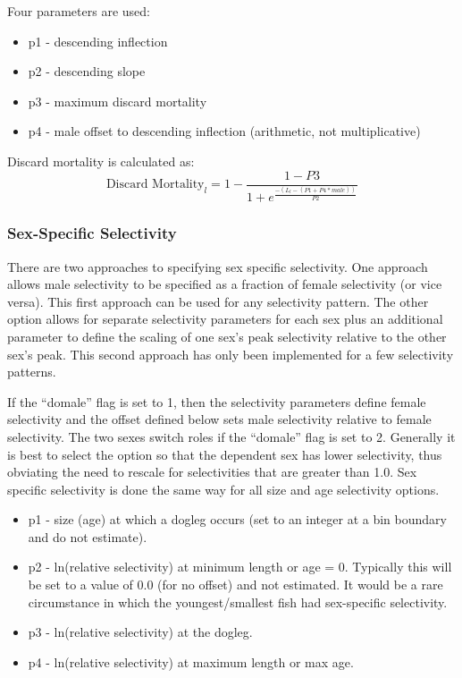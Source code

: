 Four parameters are used:
\begin{itemize}
	\item p1 - descending inflection
	\item p2 - descending slope
	\item p3 - maximum discard mortality
	\item p4 - male offset to descending inflection (arithmetic, not multiplicative)
\end{itemize}

Discard mortality is calculated as:
\begin{equation}
	\text{Discard Mortality}_l = 1 - \frac{1-P3}{1+e^{\frac{-(L_l-(P1+P4*male))}{P2}}}
\end{equation}

\subsubsection{Sex-Specific Selectivity}
There are two approaches to specifying sex specific selectivity. One approach allows male selectivity to be specified as a fraction of female selectivity (or vice versa). This first approach can be used for any selectivity pattern. The other option allows for separate selectivity parameters for each sex plus an additional parameter to define the scaling of one sex's peak selectivity relative to the other sex's peak. This second approach has only been implemented for a few selectivity patterns.

If the ``domale'' flag is set to 1, then the selectivity parameters define female selectivity and the offset defined below sets male selectivity relative to female selectivity. The two sexes switch roles if the ``domale'' flag is set to 2. Generally it is best to select the option so that the dependent sex has lower selectivity, thus obviating the need to rescale for selectivities that are greater than 1.0. Sex specific selectivity is done the same way for all size and age selectivity options.
\begin{itemize}
	\item p1 - size (age) at which a dogleg occurs (set to an integer at a bin boundary and do not estimate).
	\item p2 - ln(relative selectivity) at minimum length or age = 0. Typically this will be set to a value of 0.0 (for no offset) and not estimated. It would be a rare circumstance in which the youngest/smallest fish had sex-specific selectivity.
	\item p3 - ln(relative selectivity) at the dogleg.
	\item p4 - ln(relative selectivity) at maximum length or max age.
\end{itemize}


